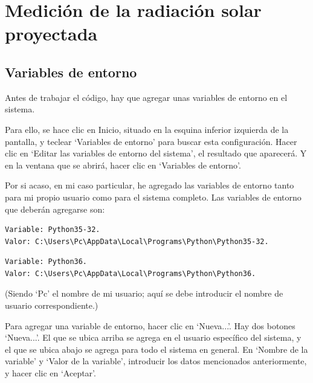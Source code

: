 \chapter{Medición de la radiación solar proyectada}

\section{Variables de entorno}

Antes de trabajar el código, hay que agregar unas variables de entorno en el sistema.

Para ello, se hace clic en Inicio, situado en la esquina inferior izquierda de la pantalla, y teclear ‘Variables de entorno’ para buscar esta configuración. Hacer clic en ‘Editar las variables de entorno del sistema’, el resultado que aparecerá. Y en la ventana que se abrirá, hacer clic en ‘Variables de entorno’.

Por si acaso, en mi caso particular, he agregado las variables de entorno tanto para mi propio usuario como para el sistema completo. Las variables de entorno que deberán agregarse son:

\begin{verbatim}
Variable: Python35-32.
Valor: C:\Users\Pc\AppData\Local\Programs\Python\Python35-32.
\end{verbatim}

\begin{verbatim}
Variable: Python36.
Valor: C:\Users\Pc\AppData\Local\Programs\Python\Python36.
\end{verbatim}

(Siendo ‘Pc’ el nombre de mi usuario; aquí se debe introducir el nombre de usuario correspondiente.)

Para agregar una variable de entorno, hacer clic en ‘Nueva...’. Hay dos botones ‘Nueva...’. El que se ubica arriba se agrega en el usuario específico del sistema, y el que se ubica abajo se agrega para todo el sistema en general. En ‘Nombre de la variable’ y ‘Valor de la variable’, introducir los datos mencionados anteriormente, y hacer clic en ‘Aceptar’.

